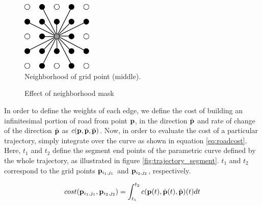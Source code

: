 \begin{figure}[ht]
\centering
\includegraphics[width=0.3\textwidth]{figure/neighbormask}
\caption{Neighborhood of grid point (middle).}
\label{fig:neighbormask}
\end{figure}

\begin{figure}[ht]
\centering
{}
\qquad
{}
\caption{Effect of neighborhood mask}
\label{fig:neighbormask_effect}
\end{figure}

In order to define the weights of each edge, we define the cost of building an infinitesimal portion of road from point ${\mathbf p}$, in the direction $\dot{\mathbf p}$ and rate of change of the direction $\ddot{\mathbf p}$ as $c({\mathbf p}, \dot{{\mathbf p}}, \ddot{{\mathbf p}})$. Now, in order to evaluate the cost of a particular trajectory, simply integrate over the curve as shown in equation \ref{eq:roadcost}. Here, $t_1$ and $t_2$ define the segment end points of the parametric curve defined by the whole trajectory, as illustrated in figure \ref{fig:trajectory_segment}. $t_1$ and $t_2$ correspond to the grid points ${\mathbf p}_{i_1,j_1}$ and ${\mathbf p}_{i_2,j_2}$, respectively.

\begin{equation}
cost({\mathbf p}_{i_1,j_1}, {\mathbf p}_{i_2,j_2}) = \int_{t_1}^{t_2} c({\mathbf p}(t), \dot{{\mathbf p}}(t), \ddot{{\mathbf p}})(t) dt
\label{eq:roadcost}
\end{equation}

